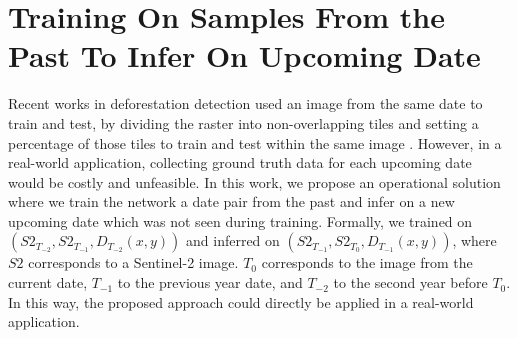 \section{Training On Samples From the Past To Infer On Upcoming Date}
\label{sec:training_past_dates}
Recent works in deforestation detection used an image from the same date to train and test, by dividing the raster into non-overlapping tiles and setting a percentage of those tiles to train and test within the same image \cite{ortega2021comparison}. However, in a real-world application, collecting ground truth data for each upcoming date would be costly and unfeasible. In this work, we propose an operational solution where we train the network a date pair from the past and infer on a new upcoming date which was not seen during training. Formally, we trained on $(S2_{T_{-2}}, S2_{T_{-1}}, D_{T_{-2}}(x,y))$ and inferred on $(S2_{T_{-1}}, S2_{T_{0}}, D_{T_{-1}}(x,y))$, where $S2$ corresponds to a Sentinel-2 image. $T_0$ corresponds to the image from the current date, $T_{-1}$ to the previous year date, and $T_{-2}$ to the second year before $T_0$. In this way, the proposed approach could directly be applied in a real-world application. %


